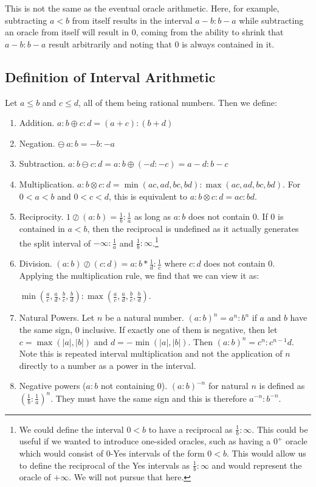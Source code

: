 \documentclass[12pt]{article}
\theoremstyle{remark}
\begin{document}
This is not the same as the eventual oracle arithmetic. Here, for example, subtracting $a<b$ from itself results in the interval $a-b:b-a$ while subtracting an oracle from itself will result in $0$, coming from the ability to shrink that $a-b:b-a$ result arbitrarily and noting that $0$ is always contained in it. 

\subsection{Definition of Interval Arithmetic}

Let $a \leq b$ and $c \leq d$, all of them being rational numbers. Then we define:
\begin{enumerate}
    \item Addition. $a:b \oplus c:d = (a+c):(b+d)$
    \item Negation. $\ominus\ a:b = -b:-a$
    \item Subtraction. $a:b \ominus c:d = a:b \oplus (-d:-c) = a-d:b-c$
    \item Multiplication. $a:b \otimes c:d = \min(ac, ad, bc, bd): \max(ac,ad,bc,bd)$. For $0<a<b$ and $0<c<d$, this is equivalent to $a:b \otimes c:d = ac:bd$. 
    \item Reciprocity. $1 \oslash (a:b) = \frac{1}{b}:\frac{1}{a}$ as long as $a:b$ does not contain 0. If 0 is contained in $a \lt b$, then the reciprocal is undefined as it actually generates the split interval of $-\infty:\frac{1}{a}$ and $\frac{1}{b}:\infty$.\footnote{We could define the interval $0 \lt b$ to have a reciprocal as $\frac{1}{b}:\infty$. This could be useful if we wanted to introduce one-sided oracles, such as having a $0^+$ oracle which would consist of $0$-Yes intervals of the form $0\lt b$. This would allow us to define the reciprocal of the Yes intervals as $\frac{1}{b}:\infty$ and would represent the oracle of $+ \infty$. We will not pursue that here.  }
    \item Division. $(a:b) \oslash (c:d) = a:b * \frac{1}{d}:\frac{1}{c}$ where $c:d$ does not contain 0. Applying the multiplication rule, we find that we can view it as:
    
    $\min(\frac{a}{c}, \frac{a}{d}, \frac{b}{c}, \frac{b}{d}): \max(\frac{a}{c},\frac{a}{d},\frac{b}{c},\frac{b}{d})$. 
    \item Natural Powers. Let $n$ be a natural number. $(a:b)^n = a^n:b^n$ if $a$ and $b$ have the same sign, 0 inclusive. If exactly one of them is negative, then let $c = \max (|a|, |b|)$ and $d=-\min(|a|, |b|)$. Then $(a:b)^n = c^n: c^{n-1}d $. Note this is repeated interval multiplication and not the application of $n$ directly to a number as a power in the interval. 
    \item Negative powers ($a:b$ not containing 0). $(a:b)^{-n}$ for natural $n$ is defined as $(\frac{1}{b}:\frac{1}{a})^n$. They must have the same sign and this is therefore $a^{-n} : b^{-n}$.
\end{enumerate}
\end{document}
